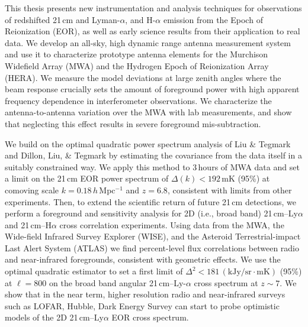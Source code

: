 % 
% 
%

This thesis presents new instrumentation and analysis techniques for observations of redshifted 21\,cm and Lyman-$\alpha$, and H-$\alpha$  emission from the Epoch of Reionization (EOR), as well as early science results from their application to real data. We develop an all-sky, high dynamic range antenna measurement system and use it to characterize prototype antenna elements for the Murchison Widefield Array (MWA) and the Hydrogen Epoch of Reionization Array (HERA). We measure the model deviations at large zenith angles where the beam response crucially sets the amount of foreground power with high apparent frequency dependence in interferometer observations. We characterize the antenna-to-antenna variation over the MWA with lab measurements, and show that neglecting this effect results in severe foreground mis-subtraction.

We build on the optimal quadratic power spectrum analysis of Liu \& Tegmark and Dillon, Liu, \& Tegmark by estimating the covariance from the data itself in a suitably constrained way. We apply this method to 3\,hours of MWA data and set a limit on the 21\,cm EOR power spectrum of $\Delta(k) < 192$\,mK (95\%) at comoving scale $k = 0.18$\,$h$\,Mpc$^{-1}$ and $z = 6.8$, consistent with limits from other experiments. Then, to extend the scientific return of future 21\,cm detections, we perform a foreground and sensitivity analysis for 2D (i.e., broad band) 21\,cm--Ly$\alpha$ and 21\,cm--H$\alpha$ cross correlation experiments. Using data from the MWA, the Wide-field Infrared Survey Explorer (WISE), and the Asteroid Terrestrial-impact Last Alert System (ATLAS) we find percent-level flux correlations between radio and near-infrared foregrounds, consistent with geometric effects. We use the optimal quadratic estimator to set a first limit of $\Delta^2<181\,(\text{kJy/sr}\cdot \text{mK})$ (95\%) at $\ell=800$ on the broad band angular 21\,cm--Ly-$\alpha$ cross spectrum at $z\sim7$. We show that in the near term, higher resolution radio and near-infrared surveys such as LOFAR, Hubble, Dark Energy Survey can start to probe optimistic models of the 2D 21\,cm--Ly$\alpha$ EOR cross spectrum. 

